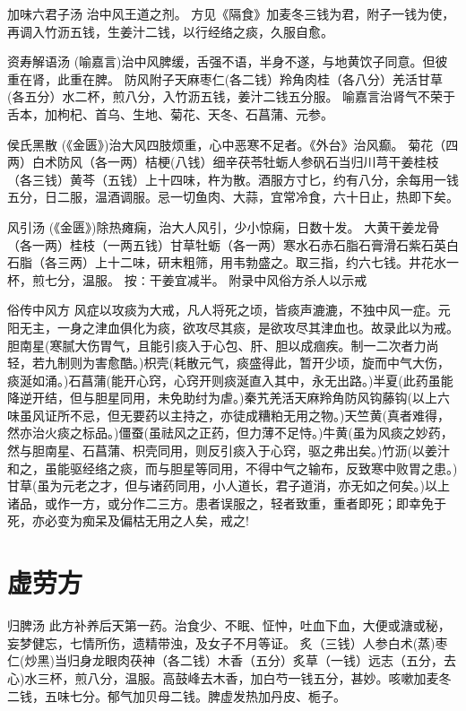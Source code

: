 \documentclass[a4paper,12pt,UTF8,twoside]{ctexbook}
\begin{document}
    加味六君子汤
    治中风王道之剂。
    方见《隔食》加麦冬三钱为君，附子一钱为使，再调入竹沥五钱，生姜汁二钱，以行经络之痰，久服自愈。
    
    资寿解语汤
    (喻嘉言)治中风脾缓，舌强不语，半身不遂，与地黄饮子同意。但彼重在肾，此重在脾。
    防风附子天麻枣仁(各二钱）羚角肉桂（各八分）羌活甘草(各五分）水二杯，煎八分，入竹沥五钱，姜汁二钱五分服。
    喻嘉言治肾气不荣于舌本，加枸杞、首乌、生地、菊花、天冬、石菖蒲、元参。
    
    侯氏黑散
    (《金匮》)治大风四肢烦重，心中恶寒不足者。《外台》治风癫。
    菊花（四两）白术防风（各一两）桔梗(八钱）细辛茯苓牡蛎人参矾石当归川芎干姜桂枝（各三钱）黄芩（五钱）上十四味，杵为散。酒服方寸匕，约有八分，余每用一钱五分，日二服，温酒调服。忌一切鱼肉、大蒜，宜常冷食，六十日止，热即下矣。
    
    风引汤
    (《金匮》)除热瘫痫，治大人风引，少小惊痫，日数十发。
    大黄干姜龙骨（各一两）桂枝（一两五钱）甘草牡蛎（各一两）寒水石赤石脂石膏滑石紫石英白石脂（各三两）上十二味，研末粗筛，用韦勃盛之。取三指，约六七钱。井花水一杯，煎七分，温服。
    按∶干姜宜减半。
     附录中风俗方杀人以示戒	
    
    俗传中风方
    风症以攻痰为大戒，凡人将死之顷，皆痰声漉漉，不独中风一症。元阳无主，一身之津血俱化为痰，欲攻尽其痰，是欲攻尽其津血也。故录此以为戒。
    胆南星(寒腻大伤胃气，且能引痰入于心包、肝、胆以成痼疾。制一二次者力尚轻，若九制则为害愈酷。)枳壳(耗散元气，痰盛得此，暂开少顷，旋而中气大伤，痰涎如涌。)石菖蒲(能开心窍，心窍开则痰涎直入其中，永无出路。)半夏(此药虽能降逆开结，但与胆星同用，未免助纣为虐。)秦艽羌活天麻羚角防风钩藤钩(以上六味虽风证所不忌，但无要药以主持之，亦徒成糟粕无用之物。)天竺黄(真者难得，然亦治火痰之标品。)僵蚕(虽祛风之正药，但力薄不足恃。)牛黄(虽为风痰之妙药，然与胆南星、石菖蒲、枳壳同用，则反引痰入于心窍，驱之弗出矣。)竹沥(以姜汁和之，虽能驱经络之痰，而与胆星等同用，不得中气之输布，反致寒中败胃之患。)甘草(虽为元老之才，但与诸药同用，小人道长，君子道消，亦无如之何矣。)以上诸品，或作一方，或分作二三方。患者误服之，轻者致重，重者即死；即幸免于死，亦必变为痴呆及偏枯无用之人矣，戒之! 
    
    \chapter{虚劳方}
    归脾汤
    此方补养后天第一药。治食少、不眠、怔忡，吐血下血，大便或溏或秘，妄梦健忘，七情所伤，遗精带浊，及女子不月等证。
    炙（三钱）人参白术(蒸)枣仁(炒黑)当归身龙眼肉茯神（各二钱）木香（五分）炙草（一钱）远志（五分，去心)水三杯，煎八分，温服。高鼓峰去木香，加白芍一钱五分，甚妙。咳嗽加麦冬二钱，五味七分。郁气加贝母二钱。脾虚发热加丹皮、栀子。
    
\end{document}
